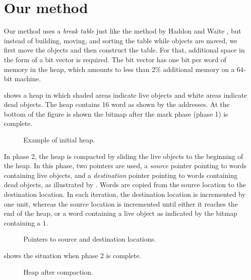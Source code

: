 \section{Our method}

Our method uses a \emph{break table} just like the method by Haddon
and Waite \cite{Haddon:1967}, but instead of building, moving, and
sorting the table while objects are moved, we first move the objects
and then construct the table.  For that, additional space in the form
of a bit vector is required.  The bit vector has one bit per word of
memory in the heap, which amounts to less than $2$\% additional memory
on a $64$-bit machine.

 shows a heap in which shaded areas indicate
live objects and white areas indicate dead objects.  The heap contains
16 word as shown by the addresses.  At the bottom of the figure is
shown the bitmap after the mark phase (phase 1) is complete.

\begin{figure}
\begin{center}
\end{center}
\caption{\label{fig-example-a}
Example of initial heap.}
\end{figure}

In phase 2, the heap is compacted by sliding the live objects to the
beginning of the heap.  In this phase, two pointers are used, a
\emph{source} pointer pointing to words containing live objects, and a
\emph{destination} pointer pointing to words containing dead objects,
as illustrated by .  Words are copied from the
source location to the destination location.  In each iteration, the
destination location is incremented by one unit, whereas the source
location is incremented until either it reaches the end of the heap,
or a word containing a live object as indicated by the bitmap
containing a $1$.

\begin{figure}
\begin{center}
\end{center}
\caption{\label{fig-example-b}
Pointers to source and destination locations.}
\end{figure}

 shows the situation when phase 2 is complete. 

\begin{figure}
\begin{center}
\end{center}
\caption{\label{fig-example-c}
Heap after compaction.}
\end{figure}

